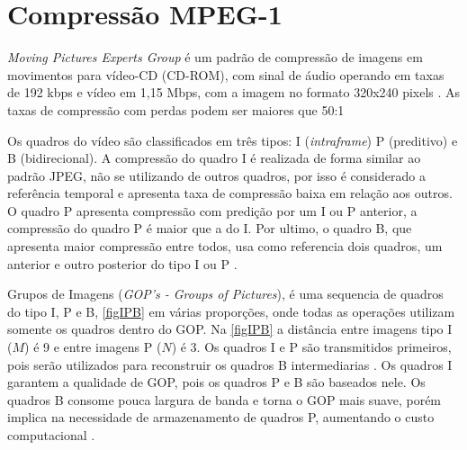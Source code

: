 

\section{Compressão MPEG-1}

\textit{Moving Pictures Experts Group} é um padrão de compressão de imagens em movimentos para vídeo-CD (CD-ROM), com sinal de áudio operando em taxas de 192 kbps e vídeo em 1,15 Mbps, com a imagem no formato 320x240 pixels \cite{oge}. As taxas de compressão com perdas podem ser maiores que 50:1 



Os quadros do vídeo são classificados em três tipos: I (\textit{intraframe}) P (preditivo) e B (bidirecional). A compressão do quadro I é realizada de forma similar ao padrão JPEG, não se utilizando de outros quadros, por isso é considerado a referência temporal e apresenta taxa de compressão baixa em relação aos outros. O quadro P apresenta compressão com predição por um I ou P anterior, a compressão do quadro P é maior que a do I. Por ultimo, o quadro B, que apresenta maior compressão entre todos, usa como referencia dois quadros, um anterior e outro posterior do tipo I ou P \cite{oge}.


Grupos de Imagens (\textit{GOP's - Groups of Pictures}),  é uma sequencia de quadros  do tipo I, P e B, \autoref{figIPB} em várias proporções, onde todas as operações utilizam somente os quadros dentro do GOP. Na \autoref{figIPB} a distância entre imagens tipo I ($M$) é 9 e entre imagens P ($N$) é 3. Os quadros  I e P são transmitidos  primeiros, pois serão utilizados para reconstruir os quadros B intermediarias \cite{tvDigitalUSP}. Os quadros I garantem a qualidade de GOP, pois os quadros P e B são baseados nele. Os quadros B consome pouca largura de banda e torna o GOP mais suave, porém implica na necessidade de armazenamento de quadros P, aumentando o custo computacional \cite{oge}.

